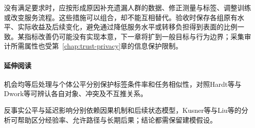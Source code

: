 没有满足要求时，应按形成原因补充遗漏人群的数据、修正测量与标签、调整训练或改变服务流程。这些措施可以组合，却不能互相替代。验收时保存各组原有水平、实际收益及后续变化，避免通过降低服务水平或转移负担得到表面的比例一致。某指标改善仍可能没有实现本意，下一章将扩到一般目标与行为边界；采集审计所需属性也受第~\ref{chap:trust-privacy}章的信息保护限制。

\paragraph{延伸阅读}

机会均等后处理与个体公平分别保护标签条件率和任务相似性，对照Hardt等与Dwork等可辨认各自对象、冲突及不互推关系。

反事实公平与延迟影响分别依赖因果机制和后续状态模型，Kusner等与Liu等的分析可帮助区分经验率、允许路径与长期后果；结论都需保留建模假设。

